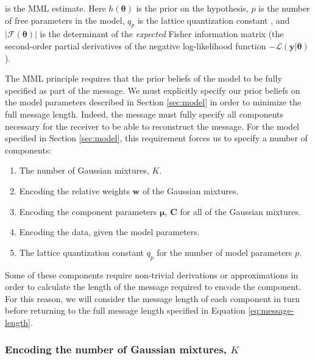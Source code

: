 \documentclass{aastex61}
\newcommand{\vect}[1]{\boldsymbol{\mathbf{#1}}}
\def\veccov{\vect{C}}
\def\vecmean{\vect{\mu}}
\def\vectheta{\vect{\theta}}
\def\weight{w}
\def\weights{\vect{\weight}}
\def\datum{y}
\def\data{\vect{\datum}}
\def\likelihood{\mathcal{L}}
\begin{document}
\noindent{}is the MML estimate.
Here $h(\vectheta)$ is the prior on the hypothesis, $p$ is the number of free
parameters in the model, $q_p$ is the lattice quantization constant
\citep[e.g.,][]{Conway_1984}, and $|\mathcal{F}\left(\vectheta\right)|$ is the
determinant of the \emph{expected} Fisher information matrix (the second-order
partial derivatives of the negative log-likelihood function 
$-\likelihood(\data|\vectheta)$).







The MML principle requires that the prior beliefs of the model to be fully 
specified as part of the message. 
We must explicitly specify our prior beliefs on the model parameters described
in Section \ref{sec:model} in order to minimize the full message length.
Indeed, the message must fully specify all components necessary for the
receiver to be able to reconstruct the message.
For the model specified in Section \ref{sec:model}, this requirement forces us
to specify a number of components:

\begin{enumerate}
  \item The number of Gaussian mixtures, $K$.
  \item Encoding the relative weights $\weights$ of the Gaussian mixtures.
  \item Encoding the component parameters $\vecmean$, $\veccov$ for all of
        the Gaussian mixtures.
  \item Encoding the data, given the model parameters.
  \item The lattice quantization constant $q_p$ for the number of model
        parameters $p$.
\end{enumerate}

Some of these components require non-trivial derivations or approximations in
order to calculate the length of the message required to encode the component.
For this reason, we will consider the message length of each component in turn
before returning to the full message length specified in Equation \ref{eq:message-length}.


\subsubsection{Encoding the number of Gaussian mixtures, $K$}
\label{sec:encoding-k}
\end{document}
